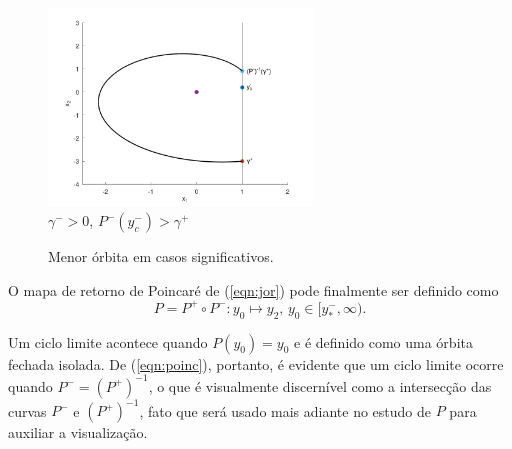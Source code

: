 \begin{figure}[H]
\centering
\begin{table}[H]
\centering
\includegraphics[width=7cm]{eeeeee}\\
\small$\gamma^->0$, $P^-(y_c^-)>\gamma^+$
\end{table}
\caption{\label{mincicle}Menor órbita em casos significativos.}
\end{figure}

O mapa de retorno de Poincaré de (\ref{eqn:jor}) pode finalmente ser definido como
\begin{equation}
\label{eqn:poinc}
P=P^+\circ P^-: y_0\mapsto y_2\text{,  }y_0\in[y_*^-, \infty).
\end{equation}

Um ciclo limite acontece quando $P(y_0)=y_0$ e é definido como uma órbita fechada isolada. De (\ref{eqn:poinc}), portanto, é evidente que um ciclo limite ocorre quando $P^-=(P^+)^{-1}$, o que é visualmente discernível como a intersecção das curvas $P^-$ e $(P^+)^{-1}$, fato que será usado mais adiante no estudo de $P$ para auxiliar a visualização. 

